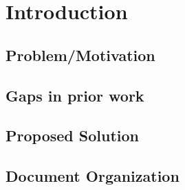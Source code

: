 \chapter{Introduction}
\chaptoc
\label{chap:intro}

\section{Problem/Motivation}

\section{Gaps in prior work}

\section{Proposed Solution}

\section{Document Organization}
